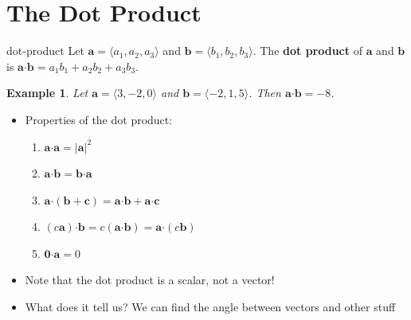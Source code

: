 \documentclass[letterpaper, 11pt, openany]{book}
\newcommand{\scdot}{\boldsymbol{\cdot}}
\theoremstyle{mytheoremstyle}
\theoremstyle{myexamplestyle}
\newtheorem{example}{Example}[section]
\begin{document}
\section{The Dot Product}
\setcounter{figure}{0}

\begin{definition}{}{dot-product}
    Let $\mathbf{a} = \langle a_{1}, a_{2}, a_{3} \rangle$ and $\mathbf{b} = \langle b_{1}, b_{2}, b_{3} \rangle$. The \textbf{dot product} of $\mathbf{a}$ and $\mathbf{b}$ is $\mathbf{a} \scdot \mathbf{b} = a_{1}b_{1} + a_{2}b_{2} + a_{3}b_{3}$.
\end{definition}

\begin{example}\label{e:dotprod-basic}
    Let $\mathbf{a} = \langle 3, -2, 0 \rangle$ and $\mathbf{b} = \langle -2, 1, 5 \rangle$. Then $\mathbf{a} \scdot \mathbf{b} = -8$.
\end{example}

\begin{itemize}
    \item Properties of the dot product:
    \begin{enumerate}
        \item \label{p:dot-itself}$\mathbf{a} \scdot \mathbf{a} = |\mathbf{a}|^{2}$
        \item $\mathbf{a} \scdot \mathbf{b} = \mathbf{b} \scdot \mathbf{a}$
        \item $\mathbf{a} \scdot (\mathbf{b} + \mathbf{c}) = \mathbf{a} \scdot \mathbf{b} + \mathbf{a} \scdot \mathbf{c}$
        \item $(c \mathbf{a}) \scdot \mathbf{b} = c(\mathbf{a} \scdot \mathbf{b}) = \mathbf{a} \scdot (c \mathbf{b})$
        \item $\mathbf{0} \scdot \mathbf{a} = 0$
    \end{enumerate}
    \item[{\faExclamationTriangle[solid]}] Note that the dot product is a scalar, not a vector!
    \item What does it tell us? We can find the angle between vectors and other stuff
\end{itemize}
\end{document}
